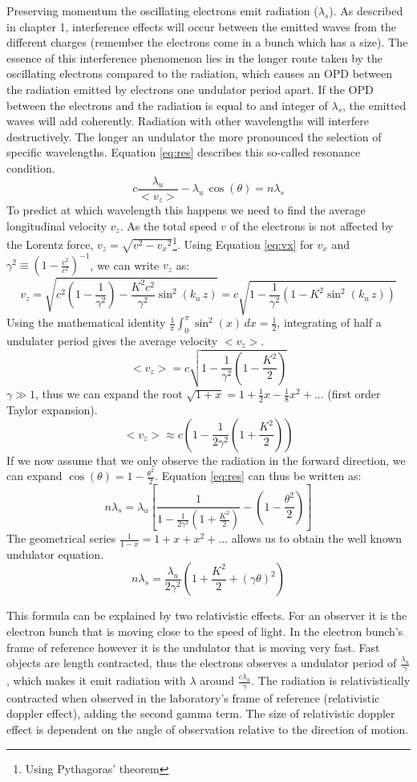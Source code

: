 Preserving momentum the oscillating electrons emit radiation ($\lambda_s$). As described in chapter 1, interference effects will occur between the emitted waves from the different charges (remember the electrons come in a bunch which has a size). The essence of this interference phenomenon lies in the longer route taken  by the oscillating electrons compared to the radiation, which causes an OPD between the radiation emitted by electrons one undulator period apart. If the OPD between the electrons and the radiation is equal to and integer of $\lambda_s$, the emitted waves will add coherently. Radiation with other wavelengths will interfere destructively. The longer an undulator the more pronounced the selection of specific wavelengths. Equation \ref{eq:res} describes this so-called resonance condition.%
\begin{equation}c\frac{\lambda_u}{<v_z>} -\lambda_u\, \cos{(\theta)} = n \lambda_s \label{eq:res}\end{equation}
To predict at which wavelength this happens we need to find the average longitudinal velocity $v_z$. As the total speed $v$ of the electrons is not affected by the Lorentz force, $v_z = \sqrt{ {v}^2-{v_x}^2}$\footnote{Using Pythagoras' theorem}. Using Equation \ref{eq:vx} for $v_x$ and $\gamma^2 \equiv (1-\frac{v^2}{c^2})^{-1}$, we can write $v_z$ as: 
\[ v_z = \sqrt{c^2(1-\frac{1}{\gamma^2})-\frac{K^2 c^2}{\gamma^2}\sin^2(k_u\,z)} = c \sqrt{1-\frac{1}{\gamma^2}(1-K^2\sin^2(k_u\,z))}\]
Using the mathematical identity $\frac{1}{\pi}\int_{0}^{\pi} \sin^2( x ) \, dx =\frac{1}{2} $, integrating of half a undulater period gives the average velocity $<v_z>$.
\[<v_z> = c\sqrt{1-\frac{1}{\gamma^2}(1-\frac{K^2}{2})}\]
${\gamma} \gg 1$, thus we can expand the root $\sqrt{1+x} = 1+\frac{1}{2}x-\frac{1}{8}x^2+ ...$ (first order Taylor expansion).
\[<v_z> \approx c(1-\frac{1}{2\gamma^2}(1+\frac{K^2}{2}) )\]
If we now assume that we only observe the radiation in the forward direction, we can expand $\cos{(\theta)} = 1-\frac{\theta^2}{2}$. 
Equation \ref{eq:res} can thus be written as:
\[ n \lambda_s = \lambda_u[\frac{1}{1-\frac{1}{2 \gamma^2}(1+\frac{K^2}{2})} - (1-\frac{\theta^2}{2})]\]
The geometrical series $\frac{1}{1-x} = 1+x+x^2+...$ allows us to obtain the well known undulator equation.
\begin{equation} n \lambda_s = \frac{\lambda_u}{2 \gamma^2}(1+\frac{K^2}{2}+(\gamma\theta)^2)\end{equation} 

This formula can be explained by two relativistic effects. For an observer it is the electron bunch that is moving close to the speed of light. In the electron bunch's frame of reference however it is the undulator that is moving very fast. Fast objects are length contracted, thus the electrons observes a undulator period of $\frac{\lambda_u}{\gamma}$, which makes it emit radiation with $\lambda$ around $\frac{c\lambda_u}{\gamma}$. The radiation is relativistically contracted when observed in the laboratory's frame of reference (relativistic doppler effect), adding the second gamma term. The size of relativistic doppler effect is dependent on the angle of observation relative to the direction of motion. 

